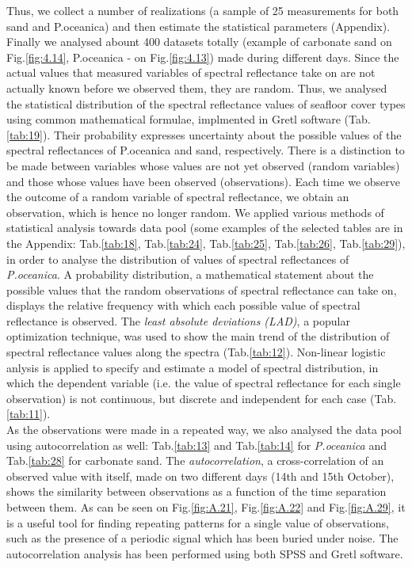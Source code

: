 \documentclass[10pt, a4paper]{article}
\begin{document}
Thus, we collect a number of realizations (a sample of 25 measurements for both sand and P.oceanica) and then estimate the statistical parameters (Appendix). \\
Finally we analysed abount 400 datasets totally (example of carbonate sand on Fig.\ref{fig:4.14}, P.oceanica - on  Fig.\ref{fig:4.13}) made during different days. 
Since the actual values that measured variables of spectral reflectance take on are not actually known before we observed them, they are random. 
Thus, we analysed the statistical distribution of the spectral reflectance values of seafloor cover types using common mathematical formulae, implmented in Gretl software (Tab.\ref{tab:19}). 
Their probability expresses uncertainty about the possible values of the spectral reflectances  of P.oceanica and sand, respectively.
There is a distinction to be made between variables whose values are not yet observed (random variables) and those whose values have been observed (observations). 
Each time we observe the outcome of a random variable of spectral reflectance, we obtain an observation, which is hence no longer random. 
We applied various methods of statistical analysis towards data pool (some examples of the selected tables are in the Appendix: Tab.\ref{tab:18}, Tab.\ref{tab:24}, Tab.\ref{tab:25}, Tab.\ref{tab:26}, Tab.\ref{tab:29}), in order to analyse the distribution of values of spectral reflectances of \textit{P.oceanica}. 
A probability distribution, a mathematical statement about the possible values that the random observations of spectral reflectance can take on, displays the relative frequency with which each possible value of spectral reflectance is observed. 
The \textit{least absolute deviations (LAD)}, a popular optimization technique, was used to show the main trend of the distribution of spectral reflectance values along the spectra (Tab.\ref{tab:12}). Non-linear logistic anlysis is applied to specify and estimate a model of spectral distribution, in which the dependent variable (i.e. the value of spectral reflectance for each single observation) is not continuous, but discrete and independent for each case (Tab.\ref{tab:11}). \\
As the observations were made in a repeated way, we also analysed the data pool using autocorrelation as well: Tab.\ref{tab:13} and Tab.\ref{tab:14} for \textit{P.oceanica} and Tab.\ref{tab:28} for carbonate sand. The \textit{autocorrelation}, a cross-correlation of an observed value with itself, made on two different days (14th and 15th October),
 shows the similarity between observations as a function of the time separation between them. As can be seen on Fig.\ref{fig:A.21}, Fig.\ref{fig:A.22} and Fig.\ref{fig:A.29}, it is a useful tool for finding repeating patterns for a single value of observations, such as the presence of a periodic signal which has been buried under noise. The autocorrelation analysis has been performed using both SPSS and Gretl software. \\
\end{document}
